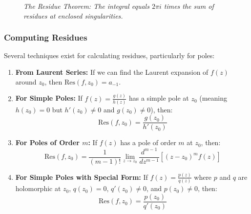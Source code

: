 \begin{figure}[H]
\centering
{}
\caption{\textit{The Residue Theorem: The integral equals $2\pi i$ times the sum of residues at enclosed singularities.}}
\label{fig:residue-theorem}
\end{figure}

\subsubsection*{Computing Residues} 

\noindent Several techniques exist for calculating residues, particularly for poles:

\begin{enumerate}
    \item \textbf{From Laurent Series:} If we can find the Laurent expansion of $f(z)$ around $z_0$, then $\text{Res}(f, z_0) = a_{-1}$.
    
    \item \textbf{For Simple Poles:} If $f(z) = \frac{g(z)}{h(z)}$ has a simple pole at $z_0$ (meaning $h(z_0) = 0$ but $h'(z_0) \neq 0$ and $g(z_0) \neq 0$), then:
    \[
    \text{Res}(f, z_0) = \frac{g(z_0)}{h'(z_0)}
    \]
    
    \item \textbf{For Poles of Order $m$:} If $f(z)$ has a pole of order $m$ at $z_0$, then:
    \[
    \text{Res}(f, z_0) = \frac{1}{(m-1)!} \lim_{z \to z_0} \frac{d^{m-1}}{dz^{m-1}} [(z - z_0)^m f(z)]
    \]
    
    \item \textbf{For Simple Poles with Special Form:} If $f(z) = \frac{p(z)}{q(z)}$ where $p$ and $q$ are holomorphic at $z_0$, $q(z_0) = 0$, $q'(z_0) \neq 0$, and $p(z_0) \neq 0$, then:
    \[
    \text{Res}(f, z_0) = \frac{p(z_0)}{q'(z_0)}
    \]
\end{enumerate}

